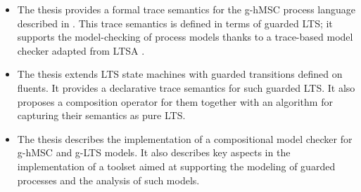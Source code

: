 \begin{itemize}
\item The thesis provides a formal trace semantics for the g-hMSC process language described in \cite{Damas:2011}. This trace semantics is defined in terms of guarded LTS; it supports the model-checking of process models thanks to a trace-based model checker adapted from LTSA \cite{Magee:1999}. 
\item The thesis extends LTS state machines with guarded transitions defined on fluents. It provides a declarative trace semantics for such guarded LTS. It also proposes a composition operator for them together with an algorithm for capturing their semantics as pure LTS.
\item The thesis describes the implementation of a compositional model checker for g-hMSC and g-LTS models. It also describes key aspects in the implementation of a toolset aimed at supporting the modeling of guarded processes and the analysis of such models. 
\end{itemize}
